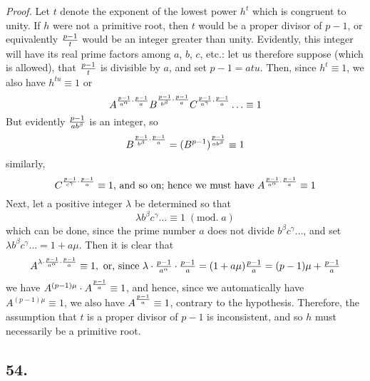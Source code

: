 \documentclass[twoside,12pt]{memoir}
\renewcommand{\pmod}[1]{\;(\textrm{mod.}\;#1)}
\let\oldfrac\frac
\def\frac#1#2{\mathchoice{\tfrac{#1}{#2}}{\oldfrac{#1}{#2}}{\genfrac{}{}{}{2}{#1}{#2\mathstrut}}{\genfrac{}{}{}{3}{#1}{#2\mathstrut}}}
\begin{document}
\textit{Proof.} Let \(t\) denote the exponent of the lowest power \(h^{t}\) which is congruent to unity. If \(h\) were not a primitive root, then \(t\) would be a proper divisor of \(p-1\), or equivalently \(\frac{p-1}{t}\) would be an integer greater than unity. Evidently, this integer will have its real prime factors among \(a\), \(b\), \(c\), etc{.}: let us therefore suppose (which is allowed), that \(\frac{p-1}{t}\) is divisible by \(a\), and set \(p-1=a t u\). Then, since \(h^{t} \equiv 1\), we also have \(h^{t u} \equiv 1\) or
\[A^{\frac{p-1}{a^{\alpha}} \cdot \frac{p-1}{a}} B^{\frac{p-1}{b^{\beta}} \cdot \frac{p-1}{a}} C^{\frac{p-1}{a^{\gamma}} \cdot \frac{p-1}{a}} \ldots \equiv 1\]
But evidently \(\frac{p-1}{a b^{\beta}}\) is an integer, so
\[B^{\frac{p-1}{b^{\beta}} \cdot \frac{p-1}{a}}=(B^{p-1})^{\frac{p-1}{a b^{\beta}}} \equiv 1\]
similarly, 
\[C^{\frac{p-1}{c^{\gamma}} \cdot \frac{p-1}{a}} \equiv 1\text{, and so on; hence we must have }A^{\frac{p-1}{a^{\alpha}} \cdot \frac{p-1}{a}} \equiv 1\] 
Next, let a positive integer \(\lambda\) be determined so that
\[\lambda b^{\beta} c^{\gamma} \ldots \equiv 1\pmod{a}\]
which can be done, since the prime number \(a\) does not divide \(b^{\beta} c^{\gamma} \ldots\), and set \(\lambda b^{\beta} c^{\gamma} \ldots=1+a \mu\). Then it is clear that
\[ A^{\lambda \cdot \frac{p-1}{a^{\alpha}} \cdot \frac{p-1}{a}} \equiv 1,\text{ or, since }\lambda \cdot \frac{p-1}{a^{\alpha}} \cdot \frac{p-1}{a} = (1+a \mu) \frac{p-1}{a} = (p-1) \mu + \frac{p-1}{a}\]
we have \(A^{(p-1) \mu} \cdot A^{\frac{p-1}{a}} \equiv 1\), and hence, since we automatically have \(A^{(p-1) \mu} \equiv 1\), we also have \(A^{\frac{p-1}{a}} \equiv 1\), contrary to the hypothesis. Therefore, the assumption that \(t\) is a proper divisor of \(p-1\) is inconsistent, and so \(h\) must necessarily be a primitive root.
%

\subsection*{54.}
\end{document}
